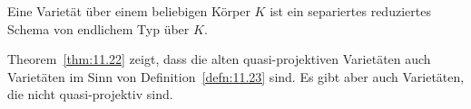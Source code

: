 \begin{defn}
\label{defn:11.23}
	Eine Varietät über einem beliebigen Körper $K$ ist ein separiertes reduziertes Schema von endlichem Typ über $K$.
\end{defn}

\begin{bem}
\label{bem:11.24}
	Theorem~\ref{thm:11.22} zeigt, dass die alten quasi-projektiven Varietäten auch Varietäten im Sinn von Definition~\ref{defn:11.23} sind. Es gibt aber auch Varietäten, die nicht quasi-projektiv sind.
\end{bem}

